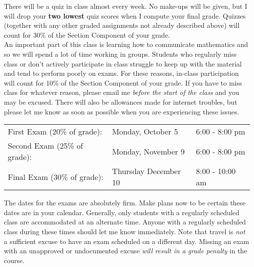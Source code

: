 \documentclass[11pt,twoside]{article}
\newcommand\topic[1]{\noindent{\bf #1}}
\begin{document}
\vspace{-2pt}
\topic{Quizzes:}  There will be a quiz in class almost every week.  No make-ups will be given, but I will drop your {\bf two lowest} quiz scores when I compute your final grade.  Quizzes (together with any other graded assignments not already described above) will count for 30\% of the Section Component of your grade.\\ %

\vspace{-2pt}
\topic{Participation:} An important part of this class is learning how to communicate mathematics and so we will spend a lot of time working in groups. Students who regularly miss class or don't actively participate in class struggle to keep up with the material and tend to perform poorly on exams. For these reasons, in-class participation will count for 10\% of the Section Component of your grade. If you have to miss class for whatever reason, please email me \emph{before the start of the class} and you may be excused. There will also be allowances made for internet troubles, but please let me know as soon as possible when you are experiencing these issues. \\ %

 \topic{Uniform Exams:} 
 \vspace{2pt}
 
\hspace{-5ex}
\begin{tabular}{lll}
{First Exam (20\%  of grade):} & Monday, October 5 & 6:00 - 8:00 pm \\
{Second Exam (25\% of grade):} &  Monday, November 9 & 6:00 - 8:00 pm  \\
{Final Exam (30\% of grade):} & Thursday December 10 & 8:00 - 10:00 am 
\end{tabular}

\vspace{0.1in} 


\noindent The dates for the exams are absolutely firm.  Make plans {\sc now} to be certain these dates are in your calendar.  Generally, only students with a regularly scheduled
class are accommodated at an alternate time. Anyone with a
regularly scheduled class during these times should let me know immediately. Note that travel is \emph{not} a sufficient excuse to have an exam scheduled on a different day.
Missing an exam with an unapproved or undocumented excuse {\em will result in a grade penalty} in the course. %
\end{document}
